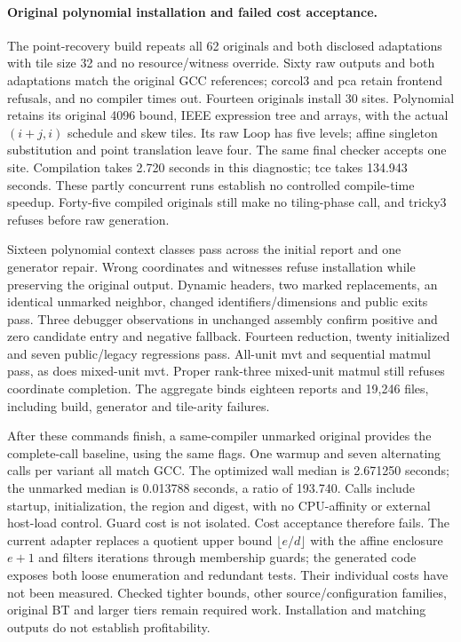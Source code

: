 \paragraph{Original polynomial installation and failed cost acceptance.}
The point-recovery build repeats all 62 originals and both disclosed adaptations
with tile size 32 and no resource/witness override. Sixty raw outputs and both
adaptations match the original GCC references; corcol3 and pca retain frontend
refusals, and no compiler times out. Fourteen originals install 30 sites.
Polynomial retains its original 4096 bound, IEEE expression tree and arrays,
with the actual $(i+j,i)$ schedule and skew tiles. Its raw Loop has five levels;
affine singleton substitution and point translation leave four. The same final
checker accepts one site. Compilation takes 2.720 seconds in this diagnostic;
tce takes 134.943 seconds. These partly concurrent runs establish no controlled
compile-time speedup. Forty-five compiled originals still make no tiling-phase
call, and tricky3 refuses before raw generation.

Sixteen polynomial context classes pass across the initial report and one
generator repair. Wrong coordinates and witnesses refuse installation while
preserving the original output. Dynamic headers, two marked replacements,
an identical unmarked neighbor, changed identifiers/dimensions and public exits
pass. Three debugger observations in unchanged assembly confirm positive and
zero candidate entry and negative fallback. Fourteen reduction, twenty
initialized and seven public/legacy regressions pass. All-unit mvt and
sequential matmul pass, as does mixed-unit mvt. Proper rank-three mixed-unit
matmul still refuses coordinate completion. The aggregate binds eighteen
reports and 19,246 files, including build, generator and tile-arity failures.

After these commands finish, a same-compiler unmarked original provides the
complete-call baseline, using the same flags. One warmup and seven alternating
calls per variant all match GCC. The optimized wall median is 2.671250 seconds;
the unmarked median is 0.013788 seconds, a ratio of 193.740. Calls include
startup, initialization, the region and digest, with no CPU-affinity or external
host-load control. Guard cost is not isolated. Cost acceptance therefore fails.
The current adapter replaces a quotient upper bound $\lfloor e/d\rfloor$ with
the affine enclosure $e+1$ and filters iterations through membership guards;
the generated code exposes both loose enumeration and redundant tests.
Their individual costs have not been measured. Checked tighter bounds,
other source/configuration families, original BT and larger tiers remain
required work. Installation and matching outputs do not establish profitability.

